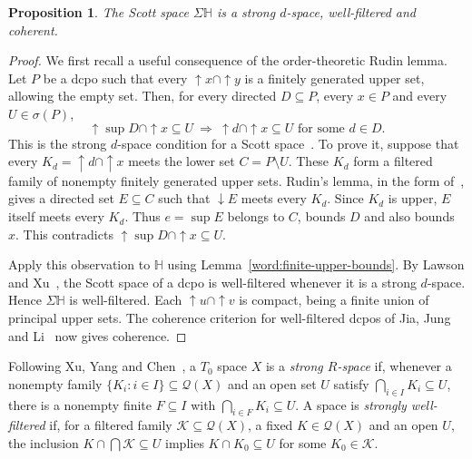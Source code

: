 \documentclass[fleqn,preprint,3p,a4paper]{elsarticle}
\newtheorem{proposition}[theorem]{Proposition}
\theoremstyle{definition}
\newcommand{\HH}{\mathbb H}
\begin{document}
\begin{proposition}\label{word:wellfiltered}
The Scott space $\Sigma\HH$ is a strong $d$-space, well-filtered and coherent.
\end{proposition}
\begin{proof}
We first recall a useful consequence of the order-theoretic Rudin lemma. Let $P$ be a dcpo such that every ${\uparrow} x\cap{\uparrow} y$ is a finitely generated upper set, allowing the empty set. Then, for every directed $D\subseteq P$, every $x\in P$ and every $U\in\sigma(P)$,
\[
 {\uparrow}\sup D\cap{\uparrow} x\subseteq U
 ~\Longrightarrow~
 {\uparrow} d\cap{\uparrow} x\subseteq U
 \text{ for some }d\in D.
\]
This is the strong $d$-space condition for a Scott space~\cite{XZ,LXLower}. To prove it, suppose that every $K_d={\uparrow} d\cap{\uparrow} x$ meets the lower set $C=P\setminus U$. These $K_d$ form a filtered family of nonempty finitely generated upper sets. Rudin's lemma, in the form of~\cite[Lemma~2.3]{LXCompact}, gives a directed set $E\subseteq C$ such that ${\downarrow} E$ meets every $K_d$. Since $K_d$ is upper, $E$ itself meets every $K_d$. Thus $e=\sup E$ belongs to $C$, bounds $D$ and also bounds $x$. This contradicts ${\uparrow}\sup D\cap{\uparrow} x\subseteq U$.

Apply this observation to $\HH$ using Lemma~\ref{word:finite-upper-bounds}. By Lawson and Xu~\cite[Corollary~64]{LXLower}, the Scott space of a dcpo is well-filtered whenever it is a strong $d$-space. Hence $\Sigma\HH$ is well-filtered. Each ${\uparrow} u\cap{\uparrow} v$ is compact, being a finite union of principal upper sets. The coherence criterion for well-filtered dcpos of Jia, Jung and Li~\cite[Lemma~3.1]{JJLCoherence} now gives coherence.
\end{proof}

Following Xu, Yang and Chen~\cite{XXC}, a $T_0$ space $X$ is a \emph{strong $R$-space} if, whenever a nonempty family $\{K_i:i\in I\}\subseteq\mathcal Q(X)$ and an open set $U$ satisfy $\bigcap_{i\in I}K_i\subseteq U$, there is a nonempty finite $F\subseteq I$ with $\bigcap_{i\in F}K_i\subseteq U$. A space is \emph{strongly well-filtered} if, for a filtered family $\mathcal K\subseteq\mathcal Q(X)$, a fixed $K\in\mathcal Q(X)$ and an open $U$, the inclusion $K\cap\bigcap\mathcal K\subseteq U$ implies $K\cap K_0\subseteq U$ for some $K_0\in\mathcal K$.
\end{document}
